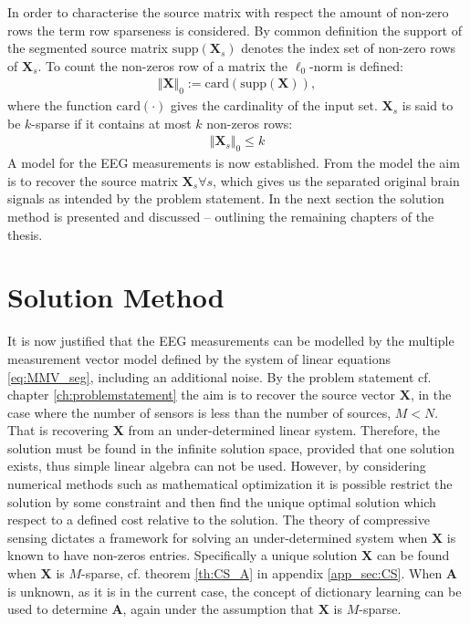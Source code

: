 In order to characterise the source matrix with respect the amount of non-zero rows the term row sparseness is considered.  
By common definition the support of the segmented source matrix $\text{supp}(\mathbf{X}_s)$ denotes the index set of non-zero rows of $\mathbf{X}_s$.
To count the non-zeros row of a matrix the $\ell_0$-norm is defined:
\begin{align*}
\Vert \mathbf{X} \Vert_0 := \text{card}(\text{supp}(\mathbf{X})),
\end{align*}
where the function $\text{card}(\cdot)$ gives the cardinality of the input set. 
$\textbf{X}_s$ is said to be $k$-sparse if it contains at most $k$ non-zeros rows:
\begin{align*}
\Vert \mathbf{X}_s \Vert_0 \leq k
\end{align*}
A model for the EEG measurements is now established.
From the model the aim is to recover the source matrix $\textbf{X}_s \forall s$, which gives us the separated original brain signals as intended by the problem statement.      
In the next section the solution method is presented and discussed -- outlining the remaining chapters of the thesis.    

\section{Solution Method}\label{sec:sol_met}
It is now justified that the EEG measurements can be modelled by the multiple measurement vector model defined by the system of linear equations \eqref{eq:MMV_seg}, including an additional noise.
By the problem statement cf. chapter \ref{ch:problemstatement} the aim is to recover the source vector $\textbf{X}$, in the case where the number of sensors is less than the number of sources, $M < N$. That is recovering $\textbf{X}$ from an under-determined linear system. Therefore, the solution must be found in the infinite solution space, provided that one solution exists, thus simple linear algebra can not be used. 
However, by considering numerical methods such as mathematical optimization it is possible restrict the solution by some constraint and then find the unique optimal solution which respect to a defined cost relative to the solution.
The theory of compressive sensing dictates a framework for solving an under-determined system when $\textbf{X}$ is known to have non-zeros entries. Specifically a unique solution $\textbf{X}$ can be found when $\textbf{X}$ is $M$-sparse, cf. theorem \ref{th:CS_A} in appendix \ref{app_sec:CS}. When $\textbf{A}$ is unknown, as it is in the current case, the concept of dictionary learning can be used to determine $\textbf{A}$, again under the assumption that $\textbf{X}$ is $M$-sparse.  

